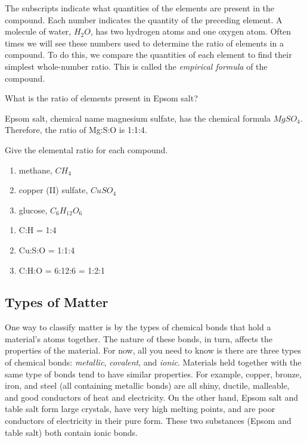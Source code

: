 The subscripts indicate what quantities of the elements are present in the compound. 
Each number indicates the quantity of the preceding element. A molecule of water, 
$H_2O$, has two hydrogen atoms and one oxygen atom. Often times we will see these
numbers used to determine the ratio of elements in a compound. To do this, we 
compare the quantities of each element to find their simplest whole-number ratio. 
This is called the \textit{empirical formula} of the compound.

\begin{Worked}
\begin{Problem}
What is the ratio of elements present in Epsom salt?
\end{Problem}
\begin{Solution}
Epsom salt, chemical name magnesium sulfate, has the chemical formula $MgSO_4$. Therefore, the ratio of Mg:S:O is 1:1:4. 
\end{Solution}
\end{Worked}

\begin{Exercise}[title = {Ratios of Atoms in Molecules}, label = num_atom]
Give the elemental ratio for each compound. 
\begin{enumerate}
\item methane, $CH_4$
\item copper (II) sulfate, $CuSO_4$
\item glucose, $C_6H_{12}O_6$
\end{enumerate}
\end{Exercise}

\begin{Answer}[ref = num_atom]
\begin{enumerate}
\item C:H = 1:4
\item Cu:S:O = 1:1:4
\item C:H:O = 6:12:6 = 1:2:1
\end{enumerate}
\end{Answer}

\subsection{Types of Matter}
One way to classify matter is by the types of chemical bonds that hold a 
material's atoms together. The nature of these bonds, in turn, affects the 
properties of the material. For now, all you need to know is there are three types
of chemical bonds: \textit{metallic}, \textit{covalent}, and \textit{ionic}. Materials held together with the
same type of bonds tend to have similar properties. For example, copper, bronze, 
iron, and steel (all containing metallic bonds) are all shiny, ductile, malleable,
and good conductors of heat and electricity. On the other hand, Epsom salt and 
table salt form large crystals, have very high melting points, and are poor 
conductors of electricity in their pure form. These two substances (Epsom and 
table salt) both contain ionic bonds. 

